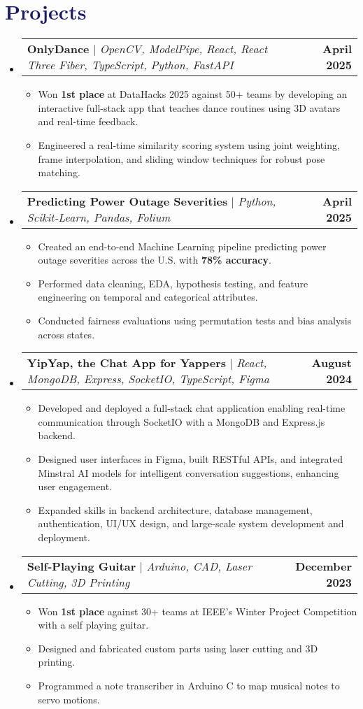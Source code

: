 \documentclass[letterpaper,11pt]{article}
\makeatletter
\newcommand{\resumeItem}[1]{
  \item\small{
    {#1 \vspace{-2pt}}
  }
}
\newcommand{\resumeProjectHeading}[2]{
    \item
    \begin{tabular*}{1.001\textwidth}{l@{\extracolsep{\fill}}r}
      \small#1 & \textbf{\small #2}\\
    \end{tabular*}\vspace{-7pt}
}
\newcommand{\resumeSubHeadingListStart}{\begin{itemize}[leftmargin=0.0in, label={}]}
\newcommand{\resumeSubHeadingListEnd}{\end{itemize}}
\newcommand{\resumeItemListStart}{\begin{itemize}}
\newcommand{\resumeItemListEnd}{\end{itemize}\vspace{-5pt}}
\newcommand\accentColor{MidnightBlue}
\makeatother
\begin{document}
\section{\textcolor{\accentColor}{Projects}}
\resumeSubHeadingListStart
\resumeProjectHeading
    {\textbf{OnlyDance} $|$ \emph{OpenCV, ModelPipe, React, React Three Fiber, TypeScript, Python, FastAPI}}{April 2025}
    \resumeItemListStart
        \resumeItem{Won \textbf{1st place} at DataHacks 2025 against 50+ teams by developing an interactive full-stack app that teaches dance routines using 3D avatars and real-time feedback.}
        \resumeItem{Engineered a real-time similarity scoring system using joint weighting, frame interpolation, and sliding window techniques for robust pose matching.}
    \resumeItemListEnd
\vspace{-15pt}
\resumeProjectHeading
    {\textbf{Predicting Power Outage Severities} $|$ \emph{Python, Scikit-Learn, Pandas, Folium}}{April 2025}
    \resumeItemListStart
        \resumeItem{Created an end-to-end Machine Learning pipeline predicting power outage severities across the U.S. with \textbf{78\% accuracy}.}
        \resumeItem{Performed data cleaning, EDA, hypothesis testing, and feature engineering on temporal and categorical attributes.}
        \resumeItem{Conducted fairness evaluations using permutation tests and bias analysis across states.}
    \resumeItemListEnd
\vspace{-15pt}
\resumeProjectHeading
    {\textbf{YipYap, the Chat App for Yappers} $|$ \emph{React, MongoDB, Express, SocketIO, TypeScript, Figma}}{August 2024}
    \resumeItemListStart
        \resumeItem{Developed and deployed a full-stack chat application enabling real-time communication through SocketIO with a MongoDB and Express.js backend.}
        \resumeItem{Designed user interfaces in Figma, built RESTful APIs, and integrated Minstral AI models for intelligent conversation suggestions, enhancing user engagement.}
        \resumeItem{Expanded skills in backend architecture, database management, authentication, UI/UX design, and large-scale system development and deployment.}
    \resumeItemListEnd
\vspace{-15pt}
\resumeProjectHeading
    {\textbf{Self-Playing Guitar} $|$ \emph{Arduino, CAD, Laser Cutting, 3D Printing}}{December 2023}
    \resumeItemListStart
        \resumeItem{Won \textbf{1st place} against 30+ teams at IEEE's Winter Project Competition with a self playing guitar.}
        \resumeItem{Designed and fabricated custom parts using laser cutting and 3D printing.}
        \resumeItem{Programmed a note transcriber in Arduino C to map musical notes to servo motions.}
    \resumeItemListEnd
\resumeSubHeadingListEnd
\vspace{-15pt}
\end{document}
